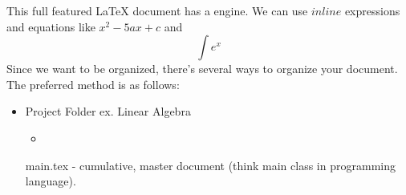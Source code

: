 \markdownRendererUlBegin
\markdownRendererUlItem This full featured LaTeX document has a  engine.\markdownRendererUlItemEnd 
\markdownRendererUlItem We can use $inline$ expressions and equations like $x^2-5ax+c$ and $$\int e^x$$\markdownRendererUlItemEnd 
\markdownRendererUlEnd \markdownRendererInterblockSeparator
{}\markdownRendererInterblockSeparator
{}Since we want to be organized, there's several ways to organize your document. The preferred method is as follows:\markdownRendererInterblockSeparator
{}\begin{itemize}\markdownRendererInterblockSeparator
{}\item Project Folder ex. Linear Algebra \begin{itemize} \item \end{itemize} main.tex - cumulative, master document (think main class in programming language).\markdownRendererInterblockSeparator
{}\end{itemize}\relax